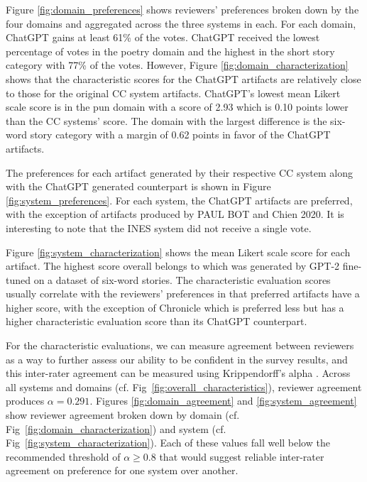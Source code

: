 \documentclass[phd,electronic,oneside,twosidetoc,letterpaper,chaptercenter,parttop,lof]{byumsphd}
\begin{document}
Figure \ref{fig:domain_preferences} shows reviewers' preferences broken down by the four domains and aggregated across the three systems in each.
For each domain, ChatGPT gains at least 61\% of the votes.
ChatGPT received the lowest percentage of votes in the poetry domain and the highest in the short story category with 77\% of the votes.
However, Figure \ref{fig:domain_characterization} shows that the characteristic scores for the ChatGPT artifacts are relatively close to those for the original CC system artifacts.
ChatGPT's lowest mean Likert scale score is in the pun domain with a score of 2.93 which is 0.10 points lower than the CC systems' score.
The domain with the largest difference is the six-word story category with a margin of 0.62 points in favor of the ChatGPT artifacts.

The preferences for each artifact generated by their respective CC system along with the ChatGPT generated counterpart is shown in Figure \ref{fig:system_preferences}.
For each system, the ChatGPT artifacts are preferred, with the exception of artifacts produced by PAUL BOT and Chien 2020.
It is interesting to note that the INES system did not receive a single vote. 

Figure \ref{fig:system_characterization} shows the mean Likert scale score for each artifact. 
The highest score overall belongs to \cite{chiengenerating} which was generated by GPT-2 fine-tuned on a dataset of six-word stories.
The characteristic evaluation scores usually correlate with the reviewers' preferences in that preferred artifacts have a higher score, with the exception of Chronicle which is preferred less but has a higher characteristic evaluation score than its ChatGPT counterpart.  

For the characteristic evaluations, we can measure agreement between reviewers as a way to further assess our ability to be confident in the survey results, and this inter-rater agreement can be measured using Krippendorff's alpha \cite{krippendorff2013contentanalysis}.
Across all systems and domains (cf. Fig~\ref{fig:overall_characteristics}), reviewer agreement produces $\alpha = 0.291$.
Figures \ref{fig:domain_agreement} and \ref{fig:system_agreement} show reviewer agreement broken down by domain (cf. Fig~\ref{fig:domain_characterization}) and system (cf. Fig~\ref{fig:system_characterization}).
Each of these values fall well below the recommended threshold of $\alpha \geq 0.8$ that would suggest reliable inter-rater agreement on preference for one system over another.
\end{document}
